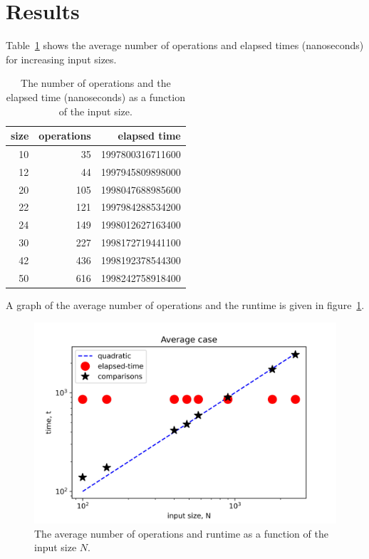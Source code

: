 \section{Results}

Table~\ref{t:time} shows the average number of operations and elapsed
times (nanoseconds) for increasing input sizes.

\begin{table}[H]	%
	\centering	%
	\caption{
		The number of operations and the elapsed time (nanoseconds)
		as a function of the input size.
	}	%

	\begin{tabular}{r r r}
		size & operations & elapsed time \\
		\hline
		10& 35& 1997800316711600 \\
		12& 44& 1997945809898000 \\
		20& 105& 1998047688985600 \\
		22& 121& 1997984288534200 \\
		24& 149& 1998012627163400 \\
		30& 227& 1998172719441100 \\
		42& 436& 1998192378544300 \\
		50& 616& 1998242758918400
	\end{tabular}

	\label{t:time}
\end{table}


A graph of the average number of operations and the runtime is given in
figure~\ref{fig:best}.

\begin{figure}[H]
	\centering
	\includegraphics[keepaspectratio]{average.jpeg}
    \caption{
		The average number of operations and runtime as a function of the input size $N$.
	} 
    
	\label{fig:best}
\end{figure}